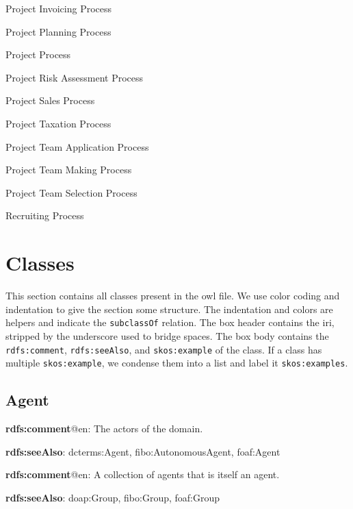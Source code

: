 \documentclass[a4paper, DIV=13, BCOR=0cm]{scrbook}
\newcommand{\relation}[1]{\texttt{#1}}
\newcommand{\prop}[1]{\texttt{#1}}
\begin{document}
\begin{multicols}{2}
\begin{compactitem}
\begin{compactitem}
			\item Project Invoicing Process
			\item Project Planning Process
			\item Project Process
			\item Project Risk Assessment Process
			\item Project Sales Process
			\item Project Taxation Process
			\item Project Team Application Process
			\item Project Team Making Process
			\item Project Team Selection Process
			\item Recruiting Process
		\end{compactitem}
	\end{compactitem}
\end{multicols}
\section{Classes}
This section contains all classes present in the \gls{owl} file. We use color coding and indentation to give the section some structure. The indentation and colors are helpers and indicate the \relation{subclassOf} relation. The box header contains the \gls{iri}, stripped by the underscore used to bridge spaces. The box body contains the \prop{rdfs:comment}, \prop{rdfs:seeAlso}, and \prop{skos:example} of the class. If a class has multiple \relation{skos:example}, we condense them into a list and label it \relation{skos:examples}.

\subsection{Agent}
\begin{mdframed}[style=onto, frametitle={Agent}]
	{%
		\begin{compactitem}
			\item \textbf{rdfs:comment}@en: The actors of the domain.
			\item \textbf{rdfs:seeAlso}: dcterms:Agent, fibo:AutonomousAgent, foaf:Agent
		\end{compactitem}
	} %
\end{mdframed}

\begin{mdframed}[style=onto-1, frametitle={Group}]
	{%
		\begin{compactitem}
			\item \textbf{rdfs:comment}@en: A collection of agents that is itself an agent.
			\item \textbf{rdfs:seeAlso}: doap:Group, fibo:Group, foaf:Group
		\end{compactitem}
	} %
\end{mdframed}
\end{document}
